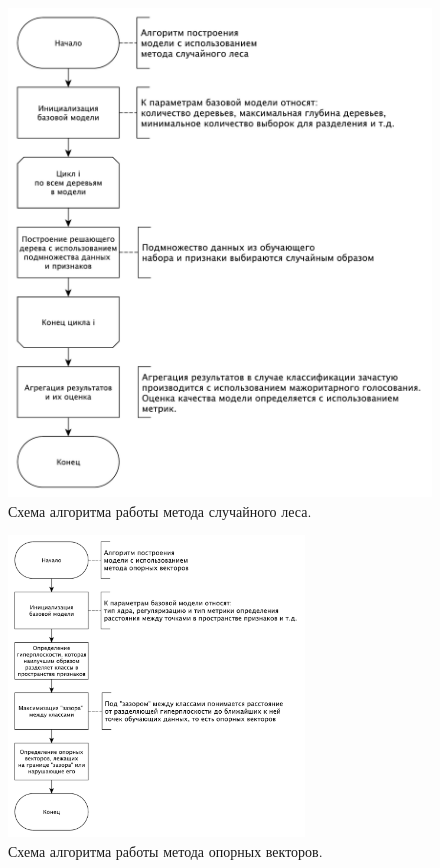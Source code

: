 \begin{figure}[H]
	\centering
	\includegraphics[width=\textwidth]{inc/schemeRandom.pdf}
	\caption{ Схема алгоритма работы метода случайного леса. }
	\label{img:schemeRandom}
\end{figure}

\begin{figure}[H]
	\centering
	\includegraphics[width=0.7\textwidth]{inc/schemeSvm.pdf}
	\caption{ Схема алгоритма работы метода опорных векторов. }
	\label{img:schemeSvm}
\end{figure}

